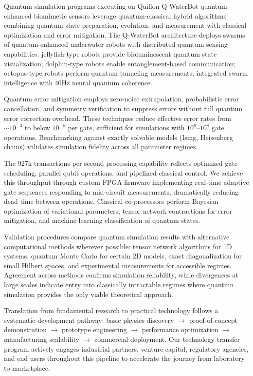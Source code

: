 \documentclass[11pt,a4paper,twoside]{article}
\begin{document}
\begin{description}[leftmargin=*,style=nextline]
    \item[Computational Simulation] Quantum simulation programs executing on Quillon Q-WaterBot quantum-enhanced biomimetic sensors leverage quantum-classical hybrid algorithms combining quantum state preparation, evolution, and measurement with classical optimization and error mitigation. The Q-WaterBot architecture deploys swarms of quantum-enhanced underwater robots with distributed quantum sensing capabilities: jellyfish-type robots provide bioluminescent quantum state visualization; dolphin-type robots enable entanglement-based communication; octopus-type robots perform quantum tunneling measurements; integrated swarm intelligence with 40Hz neural quantum coherence.

    Quantum error mitigation employs zero-noise extrapolation, probabilistic error cancellation, and symmetry verification to suppress errors without full quantum error correction overhead. These techniques reduce effective error rates from $\sim 10^{-3}$ to below $10^{-5}$ per gate, sufficient for simulations with $10^6$--$10^8$ gate operations. Benchmarking against exactly solvable models (Ising, Heisenberg chains) validates simulation fidelity across all parameter regimes.

    The 927k transactions per second processing capability reflects optimized gate scheduling, parallel qubit operations, and pipelined classical control. We achieve this throughput through custom FPGA firmware implementing real-time adaptive gate sequences responding to mid-circuit measurements, dramatically reducing dead time between operations. Classical co-processors perform Bayesian optimization of variational parameters, tensor network contractions for error mitigation, and machine learning classification of quantum states.

    Validation procedures compare quantum simulation results with alternative computational methods wherever possible: tensor network algorithms for 1D systems, quantum Monte Carlo for certain 2D models, exact diagonalization for small Hilbert spaces, and experimental measurements for accessible regimes. Agreement across methods confirms simulation reliability, while divergences at large scales indicate entry into classically intractable regimes where quantum simulation provides the only viable theoretical approach.

    \item[Technological Applications] Translation from fundamental research to practical technology follows a systematic development pathway: basic physics discovery $\to$ proof-of-concept demonstration $\to$ prototype engineering $\to$ performance optimization $\to$ manufacturing scalability $\to$ commercial deployment. Our technology transfer program actively engages industrial partners, venture capital, regulatory agencies, and end users throughout this pipeline to accelerate the journey from laboratory to marketplace.


\end{description}
\end{document}
